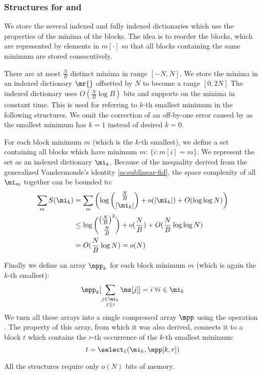 \subsubsection{Structures for \rmqSize{} and \rmqSelect{}}

We store the several indexed and fully indexed dictionaries which use the properties of the minima of the blocks.
The idea is to reorder the blocks, which are represented by elements in $m[\cdot]$ so that all blocks containing the same minimum are stored consecutively. 

There are at most $\frac{N}{B}$ distinct minima in range $[-N, N]$.
We store the minima in an indexed dictionary $\mr{}$ offsetted by $N$ to become a range $[0, 2 N]$
The indexed dictionary uses $O(\frac{N}{B} \log B)$ bits and supports \rank{} on the minima in constant time.
This is used for referring to $k$-th smallest minimum in the following structures.
We omit the correction of an off-by-one error caused by \rank{} as the smallest minimum has $k = 1$ instead of desired $k = 0$.

For each block minimum $m$ (which is the $k$-th smallest), we define a set containing all blocks which have minimum $m$: $\{ i : m[i] = m\}$.
We represent the set as an indexed dictionary $\mi_k$.
Because of the inequality derived from the generalized Vandermonde's identity \ref{ss:sublinear-fid}, the space complexity of all $\mi_m$ together can be bounded to:
\begin{align*}
	\sum_m S(\mi_k) &= \sum_m \left( \log {\frac{N}{B} \choose |\mi_k|} + o(|\mi_k|) + O(\log \log N) \right) \\
	&\le \log {\left(\frac{N}{B}\right)^2 \choose \frac{N}{B}} + o(\frac{N}{B}) + O(\frac{N}{B} \log \log N) \\
	&= O(\frac{N}{B} \log N) = o(N)
\end{align*}

Finally we define an array $\mpp_k$ for each block minimum $m$ (which is again the $k$-th smallest):
$$\mpp_k[\sum_{\substack{j \in \mi_k \\ j \le i}} \ms[j] ] = i \:\forall i \in \mi_k$$
We turn all these arrays into a single compressed array $\mpp$ using the operation \succ{}.
The property of this array, from which it was also derived, connects it to a block $t$ which contains the $r$-th occurrence of the $k$-th smallest minimum:
$$ t = \select_1(\mi_k, \mpp[k, r]) $$

All the structures require only $o(N)$ bits of memory.

\bigbreak

